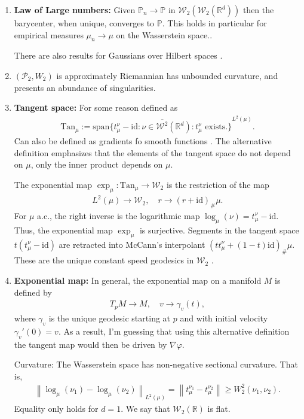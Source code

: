 \documentclass[
    a4paper,
    DIV=14,
    abstract=true,
    numbers=noenddot
]
{scrartcl}
\theoremstyle{definition}
\renewcommand{\norm}[1]{\left\lVert #1 \right\rVert}\renewcommand{\abs}[1]{\left| #1 \right|}
\newcommand{\rmm}[1]{\mathrm{#1}}
\newcommand{\R}{\mathbb{R}}
\newcommand{\Pp}{\mathcal{P}}
\newcommand{\Ww}{\mathcal{W}}
\begin{document}
\begin{enumerate}
\item \textbf{Law of Large numbers:} Given $\mathbb{P}_n \to  \mathbb{P} $ in $\Ww_2(\Ww _2(\R^d))$ then the barycenter, when unique, converges to $\mathbb{P}$. This holds in particular for empirical measures $\mu _n \to \mu $  on the Wasserstein space.\cite{le2017existence}. 

There are also results for Gaussians over Hilbert spaces \cite[Theorem 4.4]{santoro2025large}.

\item $(\Pp_2, W_2)$ is approximately Riemannian has unbounded curvature, and presents an abundance of singularities.
\item \textbf{Tangent space:} For some reason defined as  
\begin{align*}
    \rmm{Tan}_\mu :=\overline{\rmm{span}\{t_\mu ^ \nu - \rmm{id}: \nu \in \Ww ^2(\R^d): t_\mu ^\nu \text{ exists}. \}}^{L^2(\mu )} .
\end{align*}
Can also be defined as gradients fo smooth functions \cite[8.4.1,8.5.2]{santambrogio2015optimal}. The alternative definition emphasizes that the elements of the tangent space do not depend on $\mu $, only the inner product depends on $\mu $.  

The exponential map $\exp_\mu : \rmm{Tan}_\mu \to \Ww_2 $  is the restriction of the map 
\begin{align*}
    L^2(\mu ) \to \Ww_2, \quad  r \to (r+\rmm{id})_{\#}\mu.
\end{align*}
For $\mu $ a.c., the right inverse is the logarithmic map $\log_\mu (\nu)= t_\mu ^\nu - \rmm{id}$.  Thus, the exponential map $\exp_\mu$ is  surjective. Segments in the tangent space $t(t_\mu^\nu -\rmm{id})$ are retracted into McCann's interpolant $ (t t_\mu^\nu +(1-t)\rmm{id})_{\#} \mu $. These are the unique constant speed geodesics in $\Ww _2$ \cite[Proposition 5.32]{ambrosio2005gradient}.

\item \textbf{Exponential map:} In general, the exponential map on a manifold $M$ is defined by 
\begin{align*}
    T_p M \to M, \quad v \to \gamma_v(t),
\end{align*}
where $\gamma_v$ is the unique geodesic starting at $p$ and with initial velocity $\gamma _v'(0)=v$. As a result, I'm guessing that using this alternative definition the tangent map would then be driven by $\nabla \varphi $. 


Curvature: The Wasserstein space has non-negative sectional curvature. That is,
\begin{align*}
    \norm{\log_\mu (\nu_1)- \log_\mu (\nu _2)}_{L^2(\mu )}= \norm{t_\mu ^{\nu _1}-t_\mu ^{\nu _2}}\geq W_2^2(\nu _1,\nu _2).
\end{align*}
Equality only holds for $d=1$. We say that $\Ww _2(\R)$ is flat. 


\end{enumerate}
\end{document}
